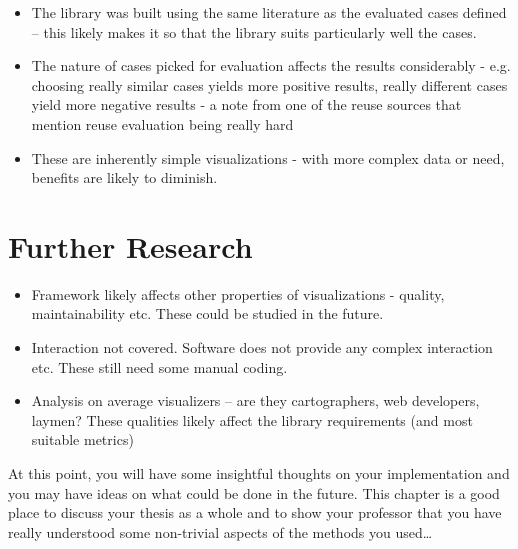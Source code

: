 \begin{itemize}
	\item The library was built using the same literature as the evaluated cases defined -- this likely makes it so that the library suits particularly well the cases.
	\item The nature of cases picked for evaluation affects the results considerably - e.g. choosing really similar cases yields more positive results, really different cases yield more negative results - a note from one of the reuse sources that mention reuse evaluation being really hard
	\item These are inherently simple visualizations - with more complex data or need, benefits are likely to diminish.
\end{itemize}

\section{Further Research}

\begin{itemize}
	\item Framework likely affects other properties of visualizations - quality, maintainability etc. These could be studied in the future.
	\item Interaction not covered. Software does not provide any complex interaction etc. These still need some manual coding.
	\item Analysis on average visualizers -- are they cartographers, web developers, laymen? These qualities likely affect the library requirements (and most suitable metrics)
\end{itemize}

At this point, you will have some insightful thoughts on your implementation
and you may have ideas on what could be done in the future. 
This chapter is a good place to discuss your thesis as a whole and to show your
professor that you have really understood some non-trivial aspects of the
methods you used\ldots